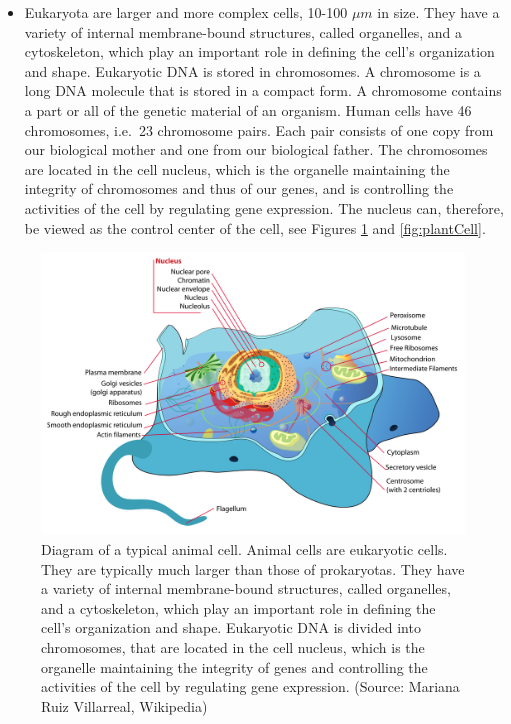 \documentclass[
  11pt,
]{book}
\providecommand{\tightlist}{%
  \setlength{\itemsep}{0pt}\setlength{\parskip}{0pt}}
\begin{document}
\begin{itemize}
\tightlist
\item
  Eukaryota are larger and more complex cells, 10-100 \(\mu m\) in size. They have a variety of internal membrane-bound structures, called organelles, and a cytoskeleton, which play an important role in defining the cell's organization and shape. Eukaryotic DNA is stored in chromosomes. A chromosome is a long DNA molecule that is stored in a compact form. A chromosome contains a part or all of the genetic material of an organism. Human cells have 46 chromosomes, i.e.~23 chromosome pairs. Each pair consists of one copy from our biological mother and one from our biological father. The chromosomes are located in the cell nucleus, which is the organelle maintaining the integrity of chromosomes and thus of our genes, and is controlling the activities of the cell by regulating gene expression. The nucleus can, therefore, be viewed as the control center of the cell, see Figures \ref{fig:animalCell} and \ref{fig:plantCell}.
\end{itemize}

\begin{figure}

{\centering \includegraphics[width=0.5\linewidth]{./figs/animalCell} 

}

\caption{Diagram of a typical animal cell. Animal cells are eukaryotic cells. They are typically much larger than those of prokaryotas. They have a variety of internal membrane-bound structures, called organelles, and a cytoskeleton, which play an important role in defining the cell's organization and shape. Eukaryotic DNA is divided into chromosomes, that are located in the cell nucleus, which is the organelle maintaining the integrity of genes and controlling the activities of the cell by regulating gene expression. (Source: Mariana Ruiz Villarreal, Wikipedia)}\label{fig:animalCell}
\end{figure}
\end{document}
